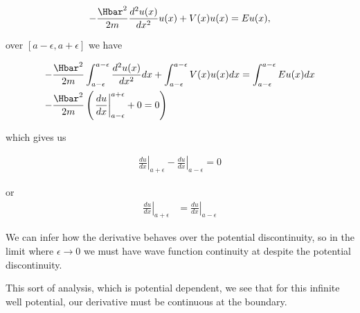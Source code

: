 {\begin{equation}\label{eqn:PHY356Lecture9:20}
\begin{aligned}
-\frac{\Hbar^2 }{2m} \frac{d^2 u(x)}{dx^2} u(x) + V(x) u(x) = E u(x),
\end{aligned}
\end{equation}

over \([a-\epsilon,a+\epsilon]\) we have

\begin{equation}\label{eqn:PHY356Lecture9:21}
\begin{aligned}
-\frac{\Hbar^2 }{2m} &
\int_{a-\epsilon}^{a-\epsilon}
\frac{d^2 u(x)}{dx^2} dx
+
\int_{a-\epsilon}^{a-\epsilon}
V(x) u(x) dx =
\int_{a-\epsilon}^{a-\epsilon}
E u(x) dx \\
-\frac{\Hbar^2 }{2m} &
\left(
\left.\frac{du}{dx}\right\vert_{a-\epsilon}^{a+\epsilon} + 0 = 0
\right)
\end{aligned}
\end{equation}

which gives us

\begin{equation}\label{eqn:PHY356Lecture9:22}
\begin{aligned}
\left.\frac{du}{dx}\right\vert_{a + \epsilon}
-\left.\frac{du}{dx}\right\vert_{a - \epsilon} = 0
\end{aligned}
\end{equation}

or
\begin{equation}\label{eqn:PHY356Lecture9:23}
\begin{aligned}
\left.\frac{du}{dx}\right\vert_{a + \epsilon}
&=
\left.\frac{du}{dx}\right\vert_{a - \epsilon}
\end{aligned}
\end{equation}

We can infer how the derivative behaves over the potential discontinuity, so in the limit where \(\epsilon \rightarrow 0\) we must have wave function continuity at despite the potential discontinuity.

This sort of analysis, which is potential dependent, we see that for this infinite well potential, our derivative must be continuous at the boundary.

} %

